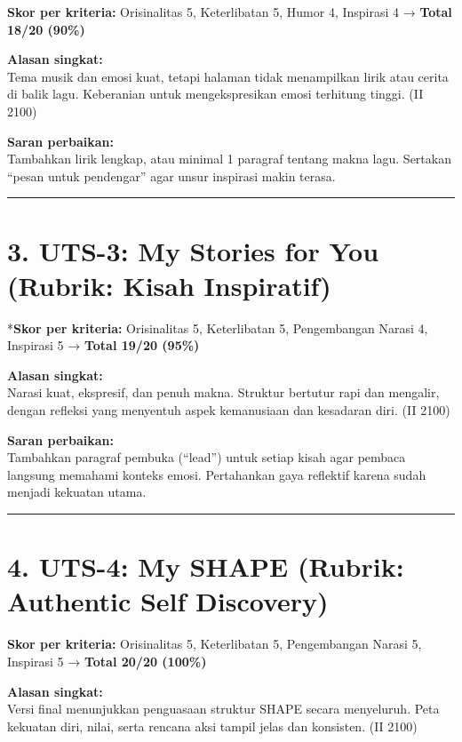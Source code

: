 \documentclass[
  letterpaper,
  DIV=11,
  numbers=noendperiod]{scrreprt}
\begin{document}
\textbf{Skor per kriteria:} Orisinalitas 5, Keterlibatan 5, Humor 4,
Inspirasi 4 → \textbf{Total 18/20 (90\%)}

\textbf{Alasan singkat:}\\
Tema musik dan emosi kuat, tetapi halaman tidak menampilkan lirik atau
cerita di balik lagu. Keberanian untuk mengekspresikan emosi terhitung
tinggi. (II 2100)

\textbf{Saran perbaikan:}\\
Tambahkan lirik lengkap, atau minimal 1 paragraf tentang makna lagu.
Sertakan ``pesan untuk pendengar'' agar unsur inspirasi makin terasa.

\begin{center}\rule{0.5\linewidth}{0.5pt}\end{center}

\section{3. UTS-3: My Stories for You (Rubrik: Kisah
Inspiratif)}\label{uts-3-my-stories-for-you-rubrik-kisah-inspiratif}

*\textbf{Skor per kriteria:} Orisinalitas 5, Keterlibatan 5,
Pengembangan Narasi 4, Inspirasi 5 → \textbf{Total 19/20 (95\%)}

\textbf{Alasan singkat:}\\
Narasi kuat, ekspresif, dan penuh makna. Struktur bertutur rapi dan
mengalir, dengan refleksi yang menyentuh aspek kemanusiaan dan kesadaran
diri. (II 2100)

\textbf{Saran perbaikan:}\\
Tambahkan paragraf pembuka (``lead'') untuk setiap kisah agar pembaca
langsung memahami konteks emosi. Pertahankan gaya reflektif karena sudah
menjadi kekuatan utama.

\begin{center}\rule{0.5\linewidth}{0.5pt}\end{center}

\section{4. UTS-4: My SHAPE (Rubrik: Authentic Self
Discovery)}\label{uts-4-my-shape-rubrik-authentic-self-discovery}

\textbf{Skor per kriteria:} Orisinalitas 5, Keterlibatan 5, Pengembangan
Narasi 5, Inspirasi 5 → \textbf{Total 20/20 (100\%)}

\textbf{Alasan singkat:}\\
Versi final menunjukkan penguasaan struktur SHAPE secara menyeluruh.
Peta kekuatan diri, nilai, serta rencana aksi tampil jelas dan
konsisten. (II 2100)
\end{document}
